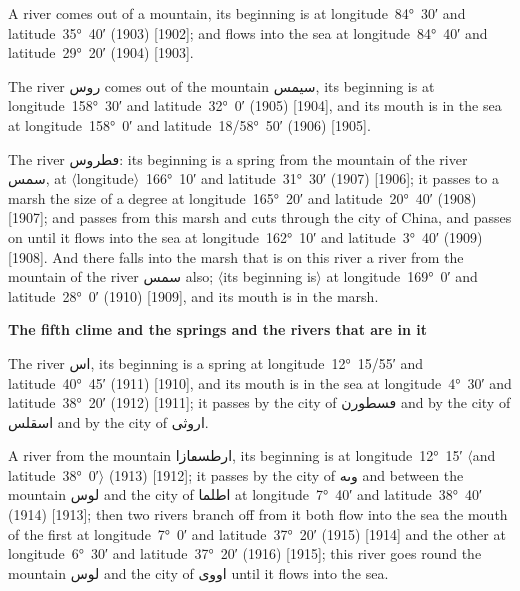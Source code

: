 \documentclass[11pt]{article}
\newcommand{\Pg}[1]{\marginpar{\footnotesize #1}}
\newcommand{\Ang}[1]{\ensuremath{#1}}
\begin{document}
A river comes out of a mountain, its beginning is at longitude~84°~30′ and latitude~35°~40′ (1903) [1902]; and flows into the sea at longitude~84°~40′ and latitude~29°~20′ (1904) [1903].

The river \textarabic{روس} comes out of the mountain \textarabic{سيمس}, its beginning is at longitude~158°~30′ and latitude~32°~0′ (1905) [1904], and its mouth is in the sea at longitude~158°~0′ and latitude~18/58°~50′ (1906) [1905].

The river \textarabic{ڡطروس}: its beginning is a spring from the mountain of the river \textarabic{سمس}, at \Ang{\langle}longitude\Ang{\rangle}~166°~10′ and latitude~31°~30′ (1907) [1906]\Pg{p. 126}; it passes to a marsh the size of a degree at longitude~165°~20′ and latitude~20°~40′ (1908) [1907]; and passes from this marsh and cuts through the city of China, and passes on until it flows into the sea at longitude~162°~10′ and latitude~3°~40′ (1909) [1908]. And there falls into the marsh that is on this river a river from the mountain of the river \textarabic{سمس} also; \Ang{\langle}its beginning is\Ang{\rangle} at longitude~169°~0′ and latitude~28°~0′ (1910) [1909], and its mouth is in the marsh.

\par\medskip\begin{center}\bfseries The fifth clime and the springs and the rivers that are in it\end{center}\par

The river \textarabic{اس}, its beginning is a spring at longitude~12°~15/55′ and latitude~40°~45′ (1911) [1910], and its mouth is in the sea at longitude~4°~30′ and latitude~38°~20′ (1912) [1911]; it passes by the city of \textarabic{ڡسطورن} and by the city of \textarabic{اسقلس} and by the city of \textarabic{اروثى}.

A river from the mountain \textarabic{ارطسڡازا}, its beginning is at longitude~12°~15′ \Ang{\langle}and latitude~38°~0′\Ang{\rangle} (1913) [1912]; it passes by the city of \textarabic{وٮه} and between the mountain \textarabic{لوس} and the city of \textarabic{اطلما} at longitude~7°~40′ and latitude~38°~40′ (1914) [1913]; then two rivers branch off from it both flow into the sea the mouth of the first at longitude~7°~0′ and latitude~37°~20′ (1915) [1914] and the other at longitude~6°~30′ and latitude~37°~20′ (1916) [1915]; this river goes round the mountain \textarabic{لوس} and the city of \textarabic{اووى} until it flows into the sea.
\end{document}
